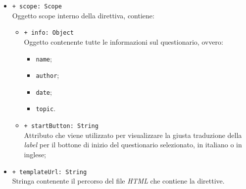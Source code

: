 \begin{itemize}
\begin{itemize}
				\item \texttt{+ scope: Scope} \\ Oggetto scope interno della direttiva, contiene:
				\begin{itemize}
					\item \texttt{+ info: Object} \\ Oggetto contenente tutte le informazioni sul questionario, ovvero:
					\begin{itemize}
						\item \texttt{name};
						\item \texttt{author};
						\item \texttt{date};
						\item \texttt{topic}.
					\end{itemize}
					\item \texttt{+ startButton: String} \\ Attributo che viene utilizzato per visualizzare la giusta traduzione della \textit{label} per il bottone di inizio del questionario selezionato, in italiano o in inglese; 
				\end{itemize}
				\item \texttt{+ templateUrl: String} \\ Stringa contenente il percorso del file \textit{HTML} che contiene la direttive.
			\end{itemize}
		\end{itemize}
		